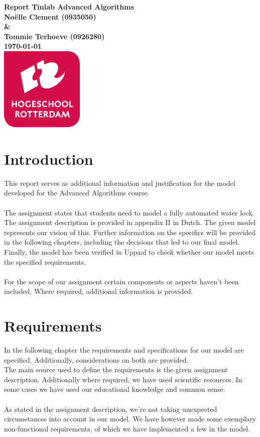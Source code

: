 \documentclass{article}
\begin{document}
\sffamily
\begin{titlepage}
  \centering
    \vfill
    {\bfseries\Huge
      Report Tinlab Advanced Algorithms \\
        \vskip2cm
      }
      {\bfseries\Large
        No{\"e}lle Clement (0935050) \\
        \& \\
        Tommie Terhoeve (0926280)\\
      }
      {
        \bfseries\normalsize
        \vskip 1cm
        \today\\
    }    
    \vfill
    \includegraphics[width=4cm]{logohr.png} %
    \vfill
    \vfill
\end{titlepage}
\newpage
\tableofcontents

\newpage
\section{Introduction}
    This report serves as additional information and justification for the model developed for the Advanced Algorithms course. \\\\
    The assignment states that students need to model a fully automated water lock. The assignment description is provided in appendix II in Dutch. The given model represents our vision of this. Further information on the specifics will be provided in the following chapters, including the decisions that led to our final model. Finally, the model has been verified in Uppaal to check whether our model meets the specified requirements. \\\\
    For the scope of our assignment certain components or aspects haven't been included. Where required, additional information is provided. 

\newpage

\section{Requirements}
    In the following chapter the requirements and specifications for our model are specified. Additionally, considerations on both are provided. \\
    The main source used to define the requirements is the given assignment description. Additionally where required, we have used scientific resources. In some cases we have used our educational knowledge and common sense. \\\\
    As stated in the assignment description, we're not taking unexpected circumstances into account in our model. We have however made some exemplary non-functional requirements, of which we have implemented a few in the model.  
    
\end{document}
